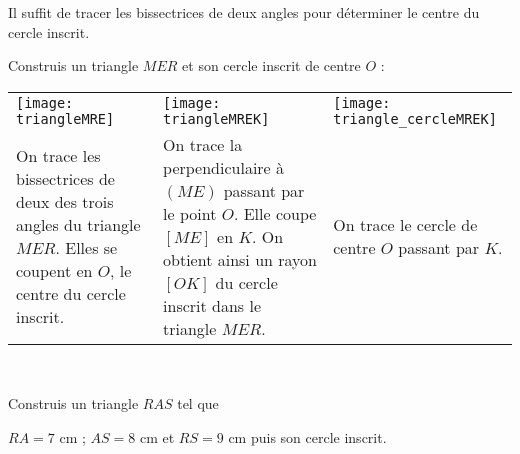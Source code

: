  \vspace{2em}
 
 \begin{methode*1}
 
 \begin{remarque}
Il suffit de tracer les bissectrices de deux angles pour déterminer le centre du cercle inscrit.
 \end{remarque}
 
 \begin{exemple*1}
 Construis un triangle $MER$ et son cercle inscrit de centre $O$ :
 \begin{tabularx}{\textwidth}{X|X|X}
 \texttt{[image: triangleMRE]} &  \texttt{[image: triangleMREK]} & \texttt{[image: triangle\_cercleMREK]} \\ 
 On trace les bissectrices de deux des trois angles du triangle $MER$. Elles se coupent en $O$, le centre du cercle inscrit. & On trace la perpendiculaire à $(ME)$ passant par le point $O$. Elle coupe $[ME]$ en $K$. On obtient ainsi un rayon $[OK]$ du cercle inscrit dans le triangle $MER$. & On trace le cercle de centre $O$ passant par $K$. \\
 \end{tabularx} \\

\end{exemple*1}
 
 \exercice
Construis un triangle $RAS$ tel que 

$RA = 7$ cm ; $AS = 8$ cm et $RS = 9$ cm puis son cercle inscrit.
 
 \end{methode*1}

